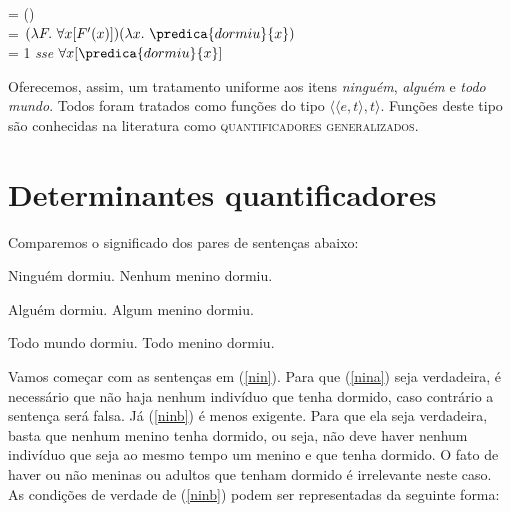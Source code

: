 \begin{exe}
	\ex {} = \den{todo mundo]}()\\
	= $(\lambda F.\ \forall x [F'(x)])(\lambda x.\ \predica{dormiu}{x})$\\
	= 1 \textit{sse} $\forall x [ \predica{dormiu}{x}]$
\end{exe}

Oferecemos, assim, um tratamento uniforme aos itens \textit{ninguém},
\textit{alguém} e \textit{todo mundo}. Todos foram tratados como funções do tipo
$\langle\langle e,t\rangle,t\rangle$. Funções deste tipo são
conhecidas na literatura como \textsc{quantificadores
generalizados}.

\section{Determinantes quantificadores}

Comparemos o significado dos pares de sentenças abaixo:

\begin{exe}
\ex\label{nin}
\begin{xlist}
\ex Ninguém dormiu.\label{nina}
\ex Nenhum menino dormiu.\label{ninb}
\end{xlist}
\end{exe}

\begin{exe}
\ex\label{alg}
\begin{xlist}
\ex Alguém dormiu.\label{alga}
\ex Algum menino dormiu.\label{algb}
\end{xlist}
\end{exe}

\begin{exe}
\ex\label{tod}
\begin{xlist}
\ex Todo mundo dormiu.\label{toda}
\ex Todo menino dormiu.\label{todb}
\end{xlist}
\end{exe}

Vamos começar com as sentenças em (\ref{nin}). Para que
(\ref{nina}) seja verdadeira, é necessário que não haja nenhum
indivíduo que tenha dormido, caso contrário a sentença será falsa. Já
(\ref{ninb}) é menos exigente. Para que ela seja verdadeira, basta
que nenhum menino tenha dormido, ou seja, não deve haver nenhum
indivíduo que seja ao mesmo tempo um menino e que tenha dormido. O
fato de haver ou não meninas ou adultos que tenham dormido é
irrelevante neste caso. As condições de verdade de (\ref{ninb})
podem ser representadas da seguinte forma:

